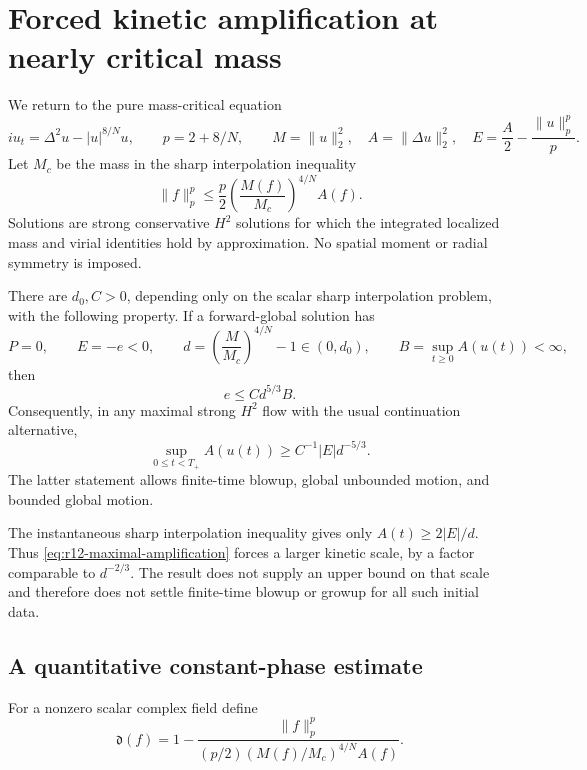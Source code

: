 \section{Forced kinetic amplification at nearly critical mass}
\label{sec:r12-amplification}

We return to the pure mass-critical equation
\[
 iu_t=\Delta^2u-|u|^{8/N}u,\qquad
 p=2+8/N,\qquad
 M=\|u\|_2^2,\quad A=\|\Delta u\|_2^2,\quad
 E=\frac A2-\frac{\|u\|_p^p}{p}.
\]
Let $M_c$ be the mass in the sharp interpolation inequality
\[
 \|f\|_p^p\le\frac p2\left(\frac{M(f)}{M_c}\right)^{4/N}A(f).
\]
Solutions are strong conservative $H^2$ solutions for which the integrated
localized mass and virial identities hold by approximation. No spatial
moment or radial symmetry is imposed.

\begin{theorem}
\label{thm:r12-amplification}
There are $d_0,C>0$, depending only on the scalar sharp interpolation
problem, with the following property. If a forward-global solution has
\[
 P=0,\qquad E=-e<0,\qquad
 d=\left(\frac M{M_c}\right)^{4/N}-1\in(0,d_0),\qquad
 B=\sup_{t\ge0}A(u(t))<\infty,
\]
then
\begin{equation}\label{eq:r12-amplification}
 e\le C d^{5/3}B.
\end{equation}
Consequently, in any maximal strong $H^2$ flow with the usual continuation
alternative,
\begin{equation}\label{eq:r12-maximal-amplification}
 \sup_{0\le t<T_+}A(u(t))\ge C^{-1}|E|d^{-5/3}.
\end{equation}
The latter statement allows finite-time blowup, global unbounded motion,
and bounded global motion.
\end{theorem}

The instantaneous sharp interpolation inequality gives only
$A(t)\ge2|E|/d$. Thus \eqref{eq:r12-maximal-amplification} forces a
larger kinetic scale, by a factor comparable to $d^{-2/3}$.
The result does not supply an upper bound on that scale and therefore
does not settle finite-time blowup or growup for all such initial data.

\subsection{A quantitative constant-phase estimate}
For a nonzero scalar complex field define
\[
 \mathfrak d(f)=1-
 \frac{\|f\|_p^p}{(p/2)(M(f)/M_c)^{4/N}A(f)}.
\]

